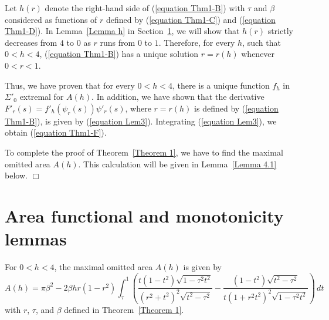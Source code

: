 \documentclass[mn,a4paper,fleqn]{w-art}
\newcommand{\be}{\begin{equation}}
\newcommand{\ee}{\end{equation}}
\newcommand{\bl}{\begin{lemma}}
\newcommand{\el}{\end{lemma}}
\begin{document}
{Let $h(r)$ denote the right-hand side of (\ref{equation Thm1-B})
with $\tau$ and $\beta$ considered as functions of $r$ defined by
(\ref{equation Thm1-C}) and (\ref{equation Thm1-D}). In
Lemma~\ref{Lemma h} in Section~\ref{Section 4}, we will show that
$h(r)$ strictly decreases from $4$ to $0$ as $r$ runs from $0$ to
$1$. Therefore, for every $h$, such that $0<h<4$, (\ref{equation Thm1-B}) has a
unique solution $r=r(h)$ whenever $0<r<1$.

Thus, we have proven that for every $0<h<4$, there is a unique
function $f_h$ in $\Sigma'_0$ extremal for $A(h)$. In addition, we
have shown that the derivative
$F'_r(s)=f'_h(\psi_r(s))\psi'_r(s)$, where $r=r(h)$ is defined by
(\ref{equation Thm1-B}), is given by (\ref{equation Lem3}).
Integrating (\ref{equation Lem3}), we obtain (\ref{equation Thm1-F}).

To complete the proof of Theorem~\ref{Theorem 1}, we have to find
the maximal omitted area $A(h)$. This calculation will be given in
Lemma~\ref{Lemma 4.1} below.  \hfill $\Box$





\section{Area functional and monotonicity lemmas} \label{Section 4}

\setcounter{equation}{0} %

\bl  \label{Lemma 4.1} For $0<h<4$, the maximal omitted area $A(h)$ is given by %
\be \label{equation A(h)}  %
A(h) = \pi \beta^2 - 2\beta hr(1-r^2) \int_{\tau}^1
\left(\frac{t(1-t^2)\sqrt{1-\tau^2t^2}}{(r^2+t^2)^2\sqrt{t^2-\tau^2}}-
\frac{(1-t^2)\sqrt{t^2-\tau^2} }{t(1+r^2t^2)^2\sqrt{1-\tau^2
t^2}}\right)\, dt
\ee  %
with $r$, $\tau$, and $\beta$ defined in Theorem~\ref{Theorem 1}.
\el %

}
\end{document}
